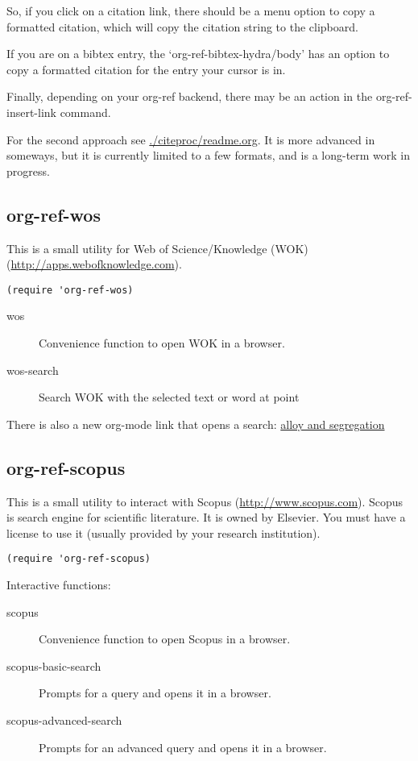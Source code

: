 \documentclass[11pt]{article}
\begin{document}
So, if you click on a citation link, there should be a menu option to copy a formatted citation, which will copy the citation string to the clipboard.

If you are on a bibtex entry, the `org-ref-bibtex-hydra/body' has an option to copy a formatted citation for the entry your cursor is in.

Finally, depending on your org-ref backend, there may be an action in the org-ref-insert-link command.

For the second approach see \url{./citeproc/readme.org}. It is more advanced in someways, but it is currently limited to a few formats, and is a long-term work in progress.

\subsection{org-ref-wos}
\label{sec:org1e92d55}
This is a small utility for Web of Science/Knowledge (WOK) (\url{http://apps.webofknowledge.com}).

\begin{verbatim}
(require 'org-ref-wos)
\end{verbatim}

\begin{description}
\item[{wos}] Convenience function to open WOK in a browser.
\item[{wos-search}] Search WOK with the selected text or word at point
\end{description}

There is also a new org-mode link that opens a search: \url{alloy and segregation}

\subsection{org-ref-scopus}
\label{sec:org00f090c}
This is a small utility to interact with Scopus (\url{http://www.scopus.com}). Scopus is search engine for scientific literature. It is owned by Elsevier. You must have a license to use it (usually provided by your research institution).

\begin{verbatim}
(require 'org-ref-scopus)
\end{verbatim}

Interactive functions:

\begin{description}
\item[{scopus}] Convenience function to open Scopus in a browser.
\item[{scopus-basic-search}] Prompts for a query and opens it in a browser.
\item[{scopus-advanced-search}] Prompts for an advanced query and opens it in a browser.
\end{description}
\end{document}
